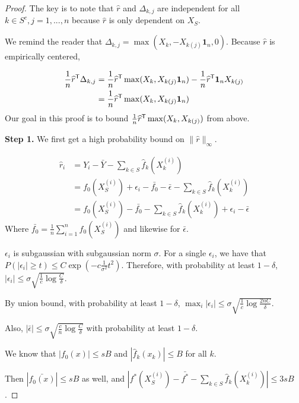 \begin{proof}
The key is to note that $\hat{r}$ and $\Delta_{k,j}$ are independent for all $k \in S^c,j=1,...,n$ because $\hat{r}$ is only dependent on $X_{S}$.

We remind the reader that $\Delta_{k,j} = \max(X_k, - X_{k(j)} \mathbf{1}_n, 0)$. Because $\hat{r}$ is empirically centered,

\begin{align*}
\frac{1}{n} \widehat{r}^{\mathsf{T}} \Delta_{k,j} &= 
              \frac{1}{n} \widehat{r}^{\mathsf{T}} \max(X_k, X_{k(j)}\mbox{\boldmath $1$}_n) 
                                       - \frac{1}{n} \widehat{r}^{\mathsf{T}} \mbox{\boldmath $1$}_n X_{k(j)} \\
                  &= \frac{1}{n} \widehat{r}^{\mathsf{T}} \max(X_k, X_{k(j)}\mbox{\boldmath $1$}_n)
\end{align*}
Our goal in this proof is to bound $\frac{1}{n} \widehat{r}^{\mathsf{T}} \max(X_k, X_{k(j)})$ from above.

\textbf{Step 1.} We first get a high probability bound on $\| \hat{r} \|_\infty$. 

\begin{align*}
\hat{r}_i &= Y_i - \bar{Y} -  \sum_{k \in S} \hat{f}_k (X_k^{(i)}) \\
	&= f_0(X_S^{(i)}) + \epsilon_i - \bar{f_0} - \bar{\epsilon}- 
                      \sum_{k \in S} \hat{f}_k(X_k^{(i)}) \\
	&=  f_0(X_S^{(i)}) - \bar{f_0} - \sum_{k \in S} \hat{f}_k(X_k^{(i)}) 
                   + \epsilon_i - \bar{\epsilon}
\end{align*}
Where $\bar{f_0} = \frac{1}{n} \sum_{i=1}^n f_0(X_S^{(i)})$ and likewise for $\bar{\epsilon}$.

$\epsilon_i$ is subgaussian with subgaussian norm $\sigma$. For a single $\epsilon_i$, we have that $P( |\epsilon_i| \geq t ) \leq C \exp( - c \frac{1}{\sigma^2} t^2)$. Therefore, with probability at least $1-\delta$, $|\epsilon_i| \leq \sigma\sqrt{ \frac{1}{c} \log \frac{C}{\delta}}$. 

By union bound, with probability at least $1-\delta$, $\max_i |\epsilon_i| \leq \sigma \sqrt{ \frac{1}{c} \log \frac{2nC}{\delta}}$.

Also, $|\bar{\epsilon}| \leq \sigma \sqrt{\frac{c}{n} \log \frac{C}{\delta}}$ with probability at least $1 - \delta$.

We know that $|f_0(x)| \leq sB$ and $|\hat{f}_k(x_k)| \leq B$ for all $k$. 

Then $|\bar{f_0(x)}| \leq sB$ as well, and $|f^*(X_S^{(i)}) - \bar{f^*} - \sum_{k \in S} \hat{f}_k(X_k^{(i)})| \leq 3s B$.


\end{proof}
